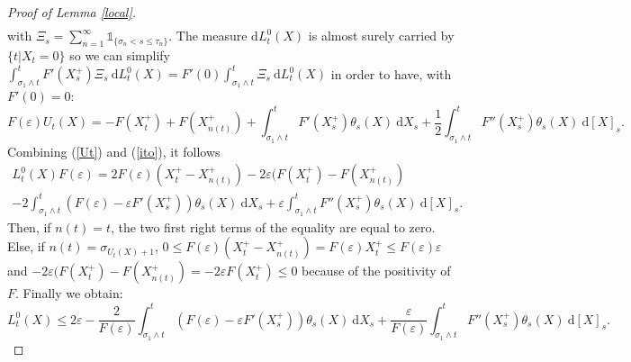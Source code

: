\documentclass[11pt]{article}
\newcommand{\di}{\mathrm{d}}
\begin{document}
\begin{proof}[Proof of Lemma \ref{local}]
\begin{multline*}
    \end{multline*}
    with $\Xi_s = \sum_{n=1}^\infty \mathds{1}_{\{\sigma_n<s\leq\tau_n\}}$.
    The measure $\di L^0_t(X)$ is almost surely carried by $\{t|X_t=0\}$ so we can simplify $\int_{\sigma_1\wedge t}^{t} F'\left(X_s^+\right)\Xi_s\ \di L^0_t(X) =F'(0)\int_{\sigma_1\wedge t}^{t} \Xi_s\ \di L^0_t(X)$ in order to have, with $F'(0)=0$:
    \begin{equation}\label{ito}
    F(\varepsilon)U_t(X) = - F\left(X^+_t\right) + F\left(X^+_{n(t)}\right) + \int_{\sigma_1\wedge t}^{ t} F'\left(X_s^+\right) \theta_s(X)\ \di X_s + \frac{1}{2}\int_{\sigma_1\wedge t}^{t} F''\left(X_s^+\right) \theta_s(X)\ \di [X]_s.
    \end{equation}
    Combining (\ref{Ut}) and (\ref{ito}), it follows
    \begin{multline*}
    L^0_t(X) F(\varepsilon) = 2 F(\varepsilon)(X^+_t-X^+_{n(t)})-2\varepsilon(F\left(X^+_t\right)-F\left(X^+_{n(t)}\right)\\-2\int_{\sigma_1\wedge t}^{ t} \left(F(\varepsilon) - \varepsilon F'\left(X_s^+\right)\right) \theta_s(X)\ \di X_s + \varepsilon\int_{\sigma_1\wedge t}^{t} F''\left(X_s^+\right)\theta_s(X)\ \di [X]_s.
    \end{multline*}
    Then, if $n(t) = t$, the two first right terms of the equality are equal to zero. Else, if $n(t) = \sigma_{U_t(X)+1}$, $0\leq F(\varepsilon)(X^+_t-X^+_{n(t)})=F(\varepsilon)X^+_t\leq F(\varepsilon)\varepsilon$ and $-2\varepsilon(F\left(X^+_t\right)-F\left(X^+_{n(t)}\right)=-2\varepsilon F\left(X^+_t\right)\leq0$ because of the positivity of $F$. Finally we obtain:
    \begin{equation*}
    L^0_t(X) \leq 2 \varepsilon-\frac{2}{F(\varepsilon)}\int_{\sigma_1\wedge t}^{ t} \left(F(\varepsilon) - \varepsilon F'\left(X_s^+\right)\right) \theta_s(X)\ \di X_s + \frac{\varepsilon}{F(\varepsilon)}\int_{\sigma_1\wedge t}^{t} F''\left(X_s^+\right)\theta_s(X)\ \di [X]_s.
    \end{equation*}
\end{proof}
\end{document}
